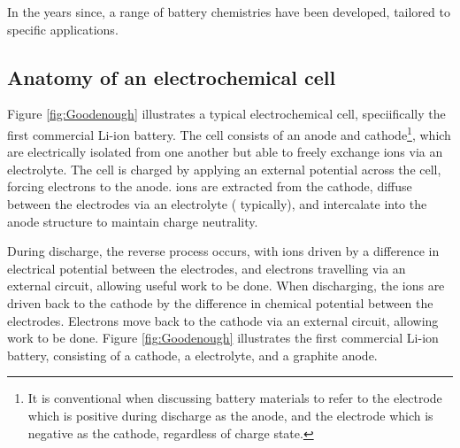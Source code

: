 In the years since, a range of battery chemistries have been developed, tailored to specific applications.

\subsection{Anatomy of an electrochemical cell}
Figure \ref{fig:Goodenough} illustrates a typical electrochemical cell, speciifically the first commercial Li-ion battery.
The cell consists of an anode and cathode\footnote{It is conventional when discussing battery materials to refer to the electrode which is positive during discharge as the anode, and the electrode which is negative as the cathode, regardless of charge state.},
which are electrically isolated from one another but able to freely exchange ions via an electrolyte.
The cell is charged by applying an external potential across the cell, forcing electrons to the anode.
 ions are extracted from the  cathode, diffuse between the electrodes via an electrolyte ( typically), and intercalate into the anode structure to maintain charge neutrality.

During discharge, the reverse process occurs, with  ions driven by a difference in electrical potential between the electrodes, and electrons travelling via an external circuit, allowing useful work to be done.
When discharging, the  ions are driven back to the cathode by the difference in chemical potential between the electrodes.
Electrons move back to the cathode via an external circuit, allowing work to be done.
Figure \ref{fig:Goodenough} illustrates the first commercial Li-ion battery, consisting of a  cathode, a  electrolyte, and a graphite anode.


